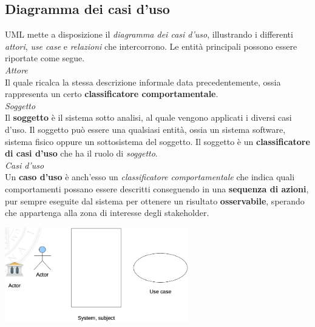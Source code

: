 \documentclass{article}
\begin{document}
\subsection*{Diagramma dei casi d'uso}
\large
UML mette a disposizione il \textit{diagramma dei casi d'uso}, illustrando i differenti \textit{attori}, \textit{use case} e \textit{relazioni} che intercorrono. Le entità principali possono essere riportate come segue.\vspace*{14pt}\\
\textit{Attore}\\Il quale ricalca la stessa descrizione informale data precedentemente, ossia rappresenta un certo \textbf{classificatore comportamentale}.\vspace*{14pt}\\
\textit{Soggetto}\\Il \textbf{soggetto} è il sistema sotto analisi, al quale vengono applicati i diversi casi d'uso. Il soggetto può essere una qualsiasi entità, ossia un sistema software, sistema fisico oppure un sottosistema del soggetto. Il soggetto è un \textbf{classificatore di casi d'uso} che ha il ruolo di \textit{soggetto}.\vspace*{14pt}\\
\textit{Casi d'uso}\\Un \textbf{caso d'uso} è anch'esso un \textit{classificatore comportamentale} che indica quali comportamenti possano essere descritti conseguendo in una \textbf{sequenza di azioni}, pur sempre eseguite dal sistema per ottenere un  risultato \textbf{osservabile}, sperando che appartenga alla zona di interesse degli stakeholder.\vspace*{14pt}\\
\begin{center}
    \includegraphics[width=0.6\textwidth]{foto 2.png}
\end{center}
\end{document}
